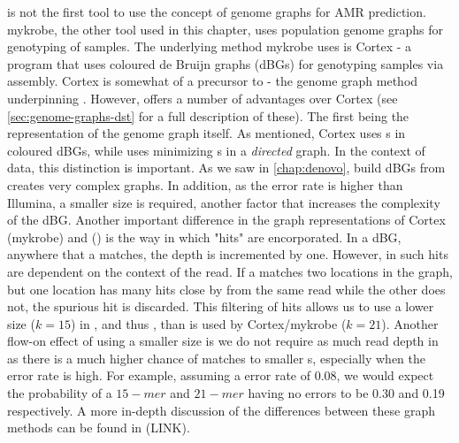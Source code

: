 \drprg{} is not the first tool to use the concept of genome graphs for AMR prediction. mykrobe, the other tool used in this chapter, uses population genome graphs for genotyping of samples. The underlying method mykrobe uses is Cortex \cite{iqbal2012} - a program that uses coloured de Bruijn graphs (dBGs) for genotyping samples via \denovo{} assembly. Cortex is somewhat of a precursor to \pandora{} - the genome graph method underpinning \drprg{}. However, \pandora{} offers a number of advantages over Cortex (see \autoref{sec:genome-graphs-dst} for a full description of these). The first being the representation of the genome graph itself. As mentioned, Cortex uses \kmer{}s in coloured dBGs, while \pandora{} uses minimizing \kmer{}s in a \emph{directed} graph. In the context of \ont{} data, this distinction is important. As we saw in \autoref{chap:denovo}, build dBGs from \ont{} creates very complex graphs. In addition, as the \ont{} error rate is higher than Illumina, a smaller \kmer{} size is required, another factor that increases the complexity of the dBG. Another important difference in the graph representations of Cortex (mykrobe) and \pandora{} (\drprg{}) is the way in which \kmer{} "hits" are encorporated. In a dBG, anywhere that a \kmer{} matches, the depth is incremented by one. However, in \pandora{} such hits are dependent on the context of the read. If a \kmer{} matches two locations in the graph, but one location has many hits close by from the same read while the other does not, the spurious hit is discarded. This filtering of \kmer{} hits allows us to use a lower \kmer{} size ($k=15$) in \pandora{}, and thus \drprg{}, than is used by Cortex/mykrobe ($k=21$). Another flow-on effect of using a smaller \kmer{} size is we do not require as much read depth in \drprg{} as there is a much higher chance of matches to smaller \kmer{}s, especially when the error rate is high. For example, assuming a \ont{} error rate of 0.08, we would expect the probability of a $15-mer$ and $21-mer$ having no errors to be 0.30 and 0.19 respectively. A more in-depth discussion of the differences between these graph methods can be found in (LINK).

